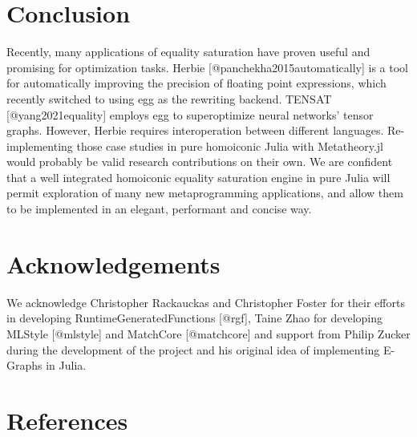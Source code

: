 \documentclass[
]{article}
\begin{document}
\hypertarget{conclusion}{%
\section{Conclusion}\label{conclusion}}

Recently, many applications of equality saturation have proven useful
and promising for optimization tasks. Herbie
{[}@panchekha2015automatically{]} is a tool for automatically improving
the precision of floating point expressions, which recently switched to
using egg as the rewriting backend. TENSAT {[}@yang2021equality{]}
employs egg to superoptimize neural networks' tensor graphs. However,
Herbie requires interoperation between different languages.
Re-implementing those case studies in pure homoiconic Julia with
Metatheory.jl would probably be valid research contributions on their
own. We are confident that a well integrated homoiconic equality
saturation engine in pure Julia will permit exploration of many new
metaprogramming applications, and allow them to be implemented in an
elegant, performant and concise way.

\hypertarget{acknowledgements}{%
\section{Acknowledgements}\label{acknowledgements}}

We acknowledge Christopher Rackauckas and Christopher Foster for their
efforts in developing RuntimeGeneratedFunctions {[}@rgf{]}, Taine Zhao
for developing MLStyle {[}@mlstyle{]} and MatchCore {[}@matchcore{]} and
support from Philip Zucker during the development of the project and his
original idea of implementing E-Graphs in Julia.

\hypertarget{references}{%
\section{References}\label{references}}
\end{document}
